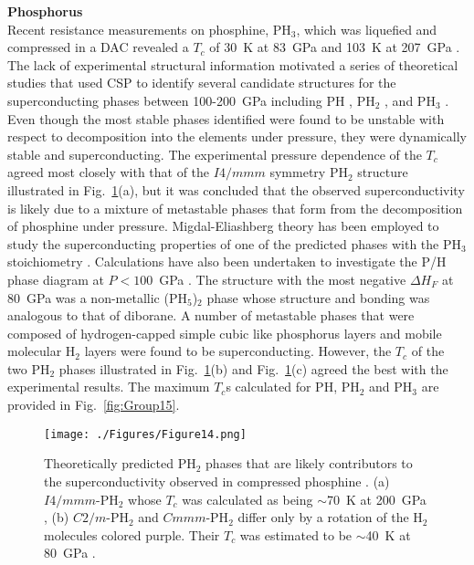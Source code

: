 \documentclass[12pt,letterpaper,oneside]{article}
\begin{document}
\noindent\textbf{Phosphorus} \\ 
%
Recent resistance measurements on phosphine, PH$_3$, which was liquefied and compressed in a DAC revealed a $T_c$ of 30~K at 83~GPa and 103~K at 207~GPa \cite{Drozdov:2015-P}. The lack of experimental structural information motivated a series of theoretical studies that used CSP to identify several candidate structures for the superconducting phases between 100-200~GPa including PH \cite{Flores:2016-P}, PH$_2$ \cite{Shamp:2016a,Flores:2016-P}, and PH$_3$ \cite{Flores:2016-P,Liu:2016-P}. Even though the most stable phases identified were found to be unstable with respect to decomposition into the elements under pressure, they were dynamically stable and superconducting.  The experimental pressure dependence of the $T_c$ agreed most closely with that of the $I4/mmm$ symmetry PH$_2$ structure \cite{Flores:2016-P} illustrated in Fig.\ \ref{fig:phosphorus}(a), but it was concluded that the observed superconductivity is likely due to a mixture of metastable phases that form from the decomposition of phosphine under pressure. Migdal-Eliashberg theory has been employed to study the superconducting properties of one of the predicted phases with the PH$_3$ stoichiometry \cite{Durajski:2016-S-P}. Calculations have also been undertaken to investigate the P/H phase diagram at $P<100$~GPa \cite{Bi:2017-P}. The structure with the most negative $\Delta H_F$ at 80~GPa was a non-metallic (PH$_5$)$_2$ phase whose structure and bonding was analogous to that of diborane. A number of metastable phases that were composed of hydrogen-capped simple cubic like phosphorus layers and mobile molecular H$_2$ layers were found to be superconducting. However, the $T_c$ of the two PH$_2$ phases illustrated in Fig.\ \ref{fig:phosphorus}(b) and Fig.\ \ref{fig:phosphorus}(c) agreed the best with the experimental results.  The maximum $T_c$s calculated for PH, PH$_2$ and PH$_3$ are provided in Fig.\ \ref{fig:Group15}.
%
\begin{figure}[h!]
\begin{center}
\texttt{[image: ./Figures/Figure14.png]}
\end{center}
\caption{Theoretically predicted PH$_2$ phases that are likely contributors to the superconductivity observed in compressed phosphine \cite{Drozdov:2015-P}. (a) $I4/mmm$-PH$_2$ whose $T_c$ was calculated as being $\sim$70~K at 200~GPa \cite{Shamp:2016a,Flores:2016-P}, (b) $C2/m$-PH$_2$ and $Cmmm$-PH$_2$ differ only by a rotation of the H$_2$ molecules colored purple. Their $T_c$ was estimated to be $\sim$40~K at 80~GPa \cite{Bi:2017-P}.}
\label{fig:phosphorus}
\end{figure}\\
\end{document}
